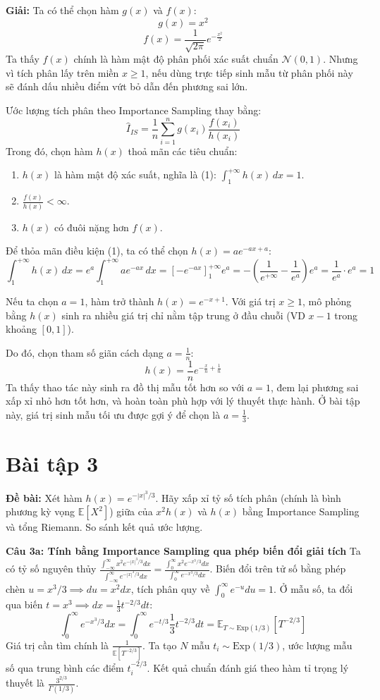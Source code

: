 \documentclass[12pt,a4paper]{article}
\begin{document}
\textbf{Giải:}
Ta có thể chọn hàm $g(x)$ và $f(x)$:
$$ g(x) = x^2 $$
$$ f(x) = \frac{1}{\sqrt{2\pi}} e^{-\frac{x^2}{2}} $$
Ta thấy $f(x)$ chính là hàm mật độ phân phối xác suất chuẩn $\mathcal{N}(0,1)$. Nhưng vì tích phân lấy trên miền $x \ge 1$, nếu dùng trực tiếp sinh mẫu từ phân phối này sẽ đánh dấu nhiều điểm vứt bỏ dẫn đến phương sai lớn.

Ước lượng tích phân theo Importance Sampling thay bằng:
$$ \hat{I}_{IS} = \frac{1}{n} \sum_{i=1}^{n} g(x_i) \frac{f(x_i)}{h(x_i)} $$
Trong đó, chọn hàm $h(x)$ thoả mãn các tiêu chuẩn:
\begin{enumerate}
    \item $h(x)$ là hàm mật độ xác suất, nghĩa là (1): $\int_{1}^{+\infty} h(x) \, dx = 1$.
    \item $\frac{f(x)}{h(x)} < \infty$.
    \item $h(x)$ có đuôi nặng hơn $f(x)$.
\end{enumerate}

Để thỏa mãn điều kiện (1), ta có thể chọn $h(x) = a e^{-ax + a}$:
$$ \int_{1}^{+\infty} h(x) \, dx = e^a \int_{1}^{+\infty} a e^{-ax} \, dx = \left[ -e^{-ax} \right]_{1}^{+\infty} e^a = - \left( \frac{1}{e^{+\infty}} - \frac{1}{e^a} \right) e^a = \frac{1}{e^a} \cdot e^a = 1 $$

Nếu ta chọn $a=1$, hàm trở thành $h(x) = e^{-x+1}$.
Với giá trị $x \ge 1$, mô phỏng bằng $h(x)$ sinh ra nhiều giá trị chỉ nằm tập trung ở đầu chuỗi (VD $x-1$ trong khoảng $[0,1]$).

Do đó, chọn tham số giãn cách dạng $a = \frac{1}{n}$:
$$ h(x) = \frac{1}{n} e^{-\frac{x}{n} + \frac{1}{n}} $$
Ta thấy thao tác này sinh ra đồ thị mẫu tốt hơn so với $a=1$, đem lại phương sai xấp xỉ nhỏ hơn tốt hơn, và hoàn toàn phù hợp với lý thuyết thực hành. Ở bài tập này, giá trị sinh mẫu tối ưu được gợi ý để chọn là $a = \frac{1}{3}$.


\section*{Bài tập 3}
\textbf{Đề bài:} Xét hàm $h(x) = e^{-|x|^3/3}$. Hãy xấp xỉ tỷ số tích phân (chính là bình phương kỳ vọng $\mathbb{E}[X^2]$) giữa của $x^2 h(x)$ và $h(x)$ bằng Importance Sampling và tổng Riemann. So sánh kết quả ước lượng.

\textbf{Câu 3a: Tính bằng Importance Sampling qua phép biến đổi giải tích}
Ta có tỷ số nguyên thủy $\frac{\int_{-\infty}^{\infty} x^2 e^{-|x|^3/3} dx}{\int_{-\infty}^{\infty} e^{-|x|^3/3} dx} = \frac{\int_{0}^{\infty} x^2 e^{-x^3/3} dx}{\int_{0}^{\infty} e^{-x^3/3} dx}$.
Biến đổi trên tử số bằng phép chèn $u = x^3/3 \implies du = x^2 dx$, tích phân quy về $\int_0^\infty e^{-u} du = 1$.
Ở mẫu số, ta đổi qua biến $t = x^3 \implies dx = \frac{1}{3}t^{-2/3} dt$:
$$ \int_0^\infty e^{-x^3/3} dx = \int_0^\infty e^{-t/3} \frac{1}{3}t^{-2/3} dt = \mathbb{E}_{T \sim \text{Exp}(1/3)} [T^{-2/3}] $$
Giá trị cần tìm chính là $\frac{1}{\mathbb{E}[T^{-2/3}]}$. Ta tạo $N$ mẫu $t_i \sim \text{Exp}(1/3)$, ước lượng mẫu số qua trung bình các điểm $t_i^{-2/3}$. Kết quả chuẩn đánh giá theo hàm tỉ trọng lý thuyết là $\frac{3^{2/3}}{\Gamma(1/3)}$.
\end{document}
